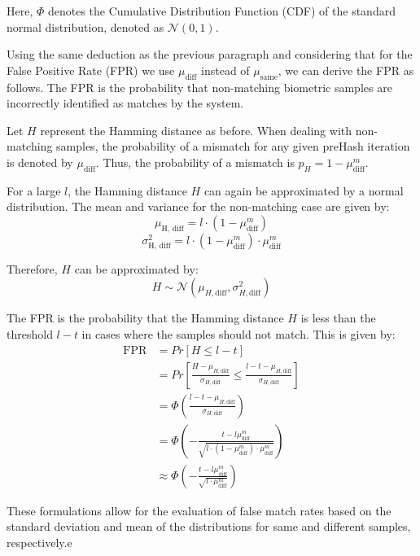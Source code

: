 Here, \(\Phi\) denotes the Cumulative Distribution Function (CDF) of the standard normal distribution, denoted as \(\mathcal{N}(0, 1)\).

Using the same deduction as the previous paragraph and considering that for the False Positive Rate (FPR) we use \(\mu_{\text{diff}}\) instead of \(\mu_{\text{same}}\), we can derive the FPR as follows. The FPR is the probability that non-matching biometric samples are incorrectly identified as matches by the system. 

Let \( H \) represent the Hamming distance as before. When dealing with non-matching samples, the probability of a mismatch for any given preHash iteration is denoted by \( \mu_{\text{diff}} \). Thus, the probability of a mismatch is \( p_H = 1 - \mu_{\text{diff}}^m \).

For a large \( l \), the Hamming distance \( H \) can again be approximated by a normal distribution. The mean and variance for the non-matching case are given by:
\[
\mu_{\text{H, diff}} = l \cdot (1 - \mu_{\text{diff}}^m)
\]
\[
\sigma_{\text{H, diff}}^2 = l \cdot (1 - \mu_{\text{diff}}^m) \cdot \mu_{\text{diff}}^m
\]

Therefore, \( H \) can be approximated by:
\[
H \sim \mathcal{N}(\mu_{H, \text{diff}}, \sigma_{H, \text{diff}}^2)
\]

The FPR is the probability that the Hamming distance \( H \) is less than the threshold \( l - t \) in cases where the samples should not match. This is given by:
\begin{equation}
\begin{aligned}
    \label{eq:fpr}
    \text{FPR} &= Pr[H \leq l - t] \\
    &= Pr\left[\frac{H - \mu_{H, \text{diff}}}{\sigma_{H, \text{diff}}} \leq \frac{l - t - \mu_{H, \text{diff}}}{\sigma_{H, \text{diff}}}\right] \\
    &= \Phi\left(\frac{l - t - \mu_{H, \text{diff}}}{\sigma_{H, \text{diff}}}\right) \\
    &= \Phi\left(-\frac{t - l\mu_{\text{diff}}^m}{\sqrt{l \cdot (1 - \mu_{\text{diff}}^m) \cdot \mu_{\text{diff}}^m}}\right)\\
    &\approx\Phi\left(-\frac{t - l\mu_{\text{diff}}^m}{\sqrt{l\cdot \mu_{\text{diff}}^m}}\right)
\end{aligned}
\end{equation}

These formulations allow for the evaluation of false match rates based on the standard deviation and mean of the distributions for same and different samples, respectively.e

